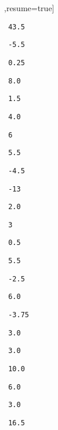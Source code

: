 \begin{solution}
\begin{sltasks}[counter-format=1.tsk[1],resume=true]
\begin{items}
      \item \texttt{ 43.5 }
      \item \texttt{ -5.5 }
      \item \texttt{ 0.25 }
    \end{items}
    \task
    \begin{items}
      \item \texttt{ 8.0 }
      \item \texttt{ 1.5 }
      \item \texttt{ 4.0 }
      \item \texttt{ 6 }
      \item \texttt{ 5.5 }
    \end{items}
    \task
    \begin{items}
      \item \texttt{ -4.5 }
      \item \texttt{ -13 }
      \item \texttt{ 2.0 }
      \item \texttt{ 3 }
      \item \texttt{ 0.5 }
    \end{items}
    \task
    \begin{items}
      \item \texttt{ 5.5 }
      \item \texttt{ -2.5 }
      \item \texttt{ 6.0 }
      \item \texttt{ -3.75 }
      \item \texttt{ 3.0 }
    \end{items}
    \task
    \begin{items}
      \item \texttt{ 3.0 }
      \item \texttt{ 10.0 }
      \item \texttt{ 6.0 }
      \item \texttt{ 3.0 }
      \item \texttt{ 16.5 }
    \end{items}
\end{sltasks}
\end{solution}
